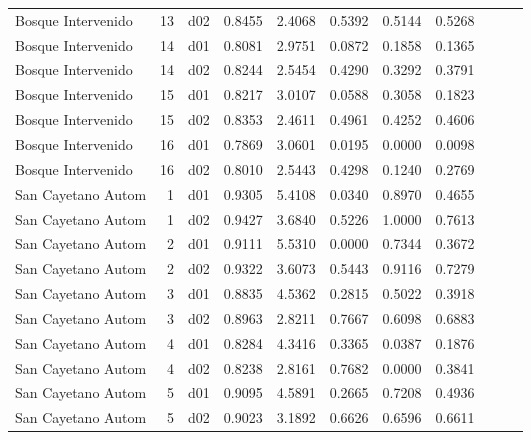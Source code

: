 \begin{landscape}
\begin{longtable}{p{2cm}rrrrrrrrrr}
    Bosque Intervenido    &         13 &     d02 &   0.8455 &  2.4068 &        0.5392 &           0.5144 &  0.5268 \\
    Bosque Intervenido    &         14 &     d01 &   0.8081 &  2.9751 &        0.0872 &           0.1858 &  0.1365 \\
    Bosque Intervenido    &         14 &     d02 &   0.8244 &  2.5454 &        0.4290 &           0.3292 &  0.3791 \\
    Bosque Intervenido    &         15 &     d01 &   0.8217 &  3.0107 &        0.0588 &           0.3058 &  0.1823 \\
    Bosque Intervenido    &         15 &     d02 &   0.8353 &  2.4611 &        0.4961 &           0.4252 &  0.4606 \\
    Bosque Intervenido    &         16 &     d01 &   0.7869 &  3.0601 &        0.0195 &           0.0000 &  0.0098 \\
    Bosque Intervenido    &         16 &     d02 &   0.8010 &  2.5443 &        0.4298 &           0.1240 &  0.2769 \\
     San Cayetano Autom   &          1 &     d01 &   0.9305 &  5.4108 &        0.0340 &           0.8970 &  0.4655 \\
     San Cayetano Autom   &          1 &     d02 &   0.9427 &  3.6840 &        0.5226 &           1.0000 &  0.7613 \\
     San Cayetano Autom   &          2 &     d01 &   0.9111 &  5.5310 &        0.0000 &           0.7344 &  0.3672 \\
     San Cayetano Autom   &          2 &     d02 &   0.9322 &  3.6073 &        0.5443 &           0.9116 &  0.7279 \\
     San Cayetano Autom   &          3 &     d01 &   0.8835 &  4.5362 &        0.2815 &           0.5022 &  0.3918 \\
     San Cayetano Autom   &          3 &     d02 &   0.8963 &  2.8211 &        0.7667 &           0.6098 &  0.6883 \\
     San Cayetano Autom   &          4 &     d01 &   0.8284 &  4.3416 &        0.3365 &           0.0387 &  0.1876 \\
     San Cayetano Autom   &          4 &     d02 &   0.8238 &  2.8161 &        0.7682 &           0.0000 &  0.3841 \\
     San Cayetano Autom   &          5 &     d01 &   0.9095 &  4.5891 &        0.2665 &           0.7208 &  0.4936 \\
     San Cayetano Autom   &          5 &     d02 &   0.9023 &  3.1892 &        0.6626 &           0.6596 &  0.6611 \\

\end{longtable}
\end{landscape}
